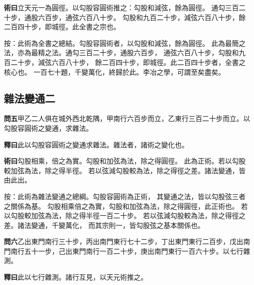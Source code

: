 \documentclass[12pt,a4paper]{article}
\newcommand{\Section}[1]{\subsection*{#1}}
\begin{document}
\vspace{0.3em}

\noindent\textbf{術曰}\quad 立天元一為圓徑。以勾股容圓術推之：勾股和減弦，餘為圓徑。
通勾三百二十步，通股六百步，通弦六百八十步。
勾股和九百二十步，減弦六百八十步，餘二百四十步，即城徑。此全書之宗也。

\vspace{0.3em}

\noindent
按：此術為全書之總結。勾股容圓術者，以勾股和減弦，餘為圓徑。
此為最簡之法，亦為最精之法。通勾三百二十步，通股六百步，
通弦六百八十步，勾股和九百二十步，減弦六百八十步，
餘二百四十步，即城徑。此二百四十步者，全書之核心也。
一百七十題，千變萬化，終歸於此。李冶之學，可謂至矣盡矣。

\Section{雜法變通二}

\noindent\textbf{問五}\quad 甲乙二人俱在城外西北乾隅，甲南行六百步而立，乙東行三百二十步而立。以勾股容圓術之變通，求雜法。

\vspace{0.3em}

\noindent\textbf{釋曰}\quad 此以勾股容圓術之變通求雜法。雜法者，諸術之變化也。

\vspace{0.3em}

\noindent\textbf{術曰}\quad 勾股相乘，倍之為實。勾股和加弦為法，除之得圓徑。
此為正術。若以勾股較加弦為法，除之得半徑。
若以弦減勾股較為法，除之得徑之差。諸法變通，皆由此出。

\vspace{0.3em}

\noindent
按：此術為雜法變通之總綱。勾股容圓術為正術，
其變通之法，皆以勾股弦三者之關係為基。
勾股相乘倍之為實，勾股和加弦為法，除之得圓徑，此正術也。
若以勾股較加弦為法，除之得半徑一百二十步。
若以弦減勾股較為法，除之得徑之差。諸法變通，千變萬化，
而其宗則一，皆勾股弦之基本關係也。

\vspace{0.5em}

\noindent\textbf{問六}\quad 乙出東門南行三十步，丙出南門東行七十二步，丁出東門東行二百步，戊出南門南行五十一步，己出東門南行一百二十步，庚出南門東行一百六十步。以七行雜測。

\vspace{0.3em}

\noindent\textbf{釋曰}\quad 此以七行雜測。諸行互見，以天元術推之。

\vspace{0.3em}
\end{document}
